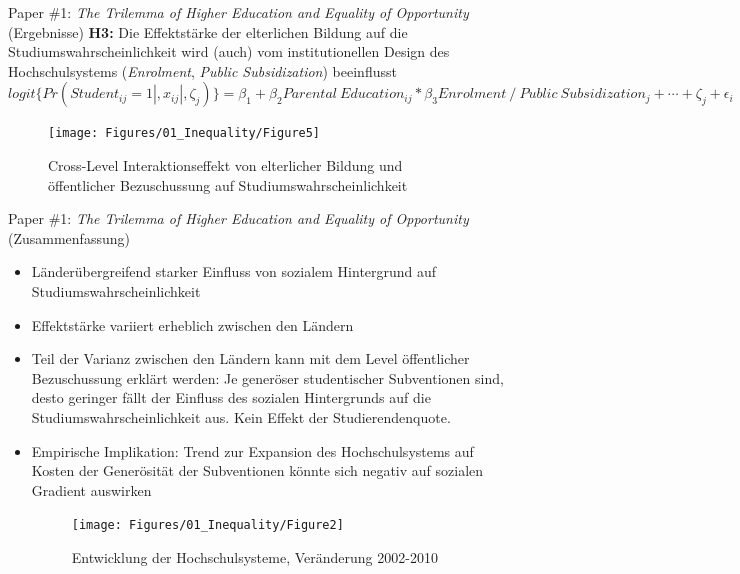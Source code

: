 \documentclass[
  ignorenonframetext,
]{beamer}
\providecommand{\tightlist}{%
  \setlength{\itemsep}{0pt}\setlength{\parskip}{0pt}}
\begin{document}
\begin{frame}{Paper \#1: \emph{The Trilemma of Higher Education and
Equality of Opportunity} (Ergebnisse)}
\protect\hypertarget{paper-1-the-trilemma-of-higher-education-and-equality-of-opportunity-ergebnisse-3}{}
\textbf{H3:} Die Effektstärke der elterlichen Bildung auf die
Studiumswahrscheinlichkeit wird (auch) vom institutionellen Design des
Hochschulsystems (\emph{Enrolment}, \emph{Public Subsidization})
beeinflusst \scriptsize 
\(logit\{Pr(Student_{ij} = 1|,x_{ij}|,\zeta_{j})\} = \beta_{1} + \beta_{2}Parental\:Education_{ij} *\beta_{3}Enrolment\: /\: Public\:Subsidization_{j} + \cdots + \zeta_{j} + \epsilon_{i}\)

\begin{figure}
\texttt{[image: Figures/01\_Inequality/Figure5]} \caption{Cross-Level Interaktionseffekt von elterlicher Bildung und öffentlicher Bezuschussung auf Studiumswahrscheinlichkeit}\label{fig:unnamed-chunk-7}
\end{figure}
\end{frame}

\begin{frame}{Paper \#1: \emph{The Trilemma of Higher Education and
Equality of Opportunity} (Zusammenfassung)}
\protect\hypertarget{paper-1-the-trilemma-of-higher-education-and-equality-of-opportunity-zusammenfassung}{}
\begin{itemize}
\tightlist
\item
  Länderübergreifend starker Einfluss von sozialem Hintergrund auf
  Studiumswahrscheinlichkeit \pause
\item
  Effektstärke variiert erheblich zwischen den Ländern \pause
\item
  Teil der Varianz zwischen den Ländern kann mit dem Level öffentlicher
  Bezuschussung erklärt werden: Je generöser studentischer Subventionen
  sind, desto geringer fällt der Einfluss des sozialen Hintergrunds auf
  die Studiumswahrscheinlichkeit aus. Kein Effekt der Studierendenquote.
  \pause
\item
  Empirische Implikation: Trend zur Expansion des Hochschulsystems auf
  Kosten der Generösität der Subventionen könnte sich negativ auf
  sozialen Gradient auswirken

  \begin{figure}
  \texttt{[image: Figures/01\_Inequality/Figure2]} \caption{Entwicklung der Hochschulsysteme, Veränderung 2002-2010}\label{fig:unnamed-chunk-8}
  \end{figure}
\end{itemize}
\end{frame}
\end{document}
